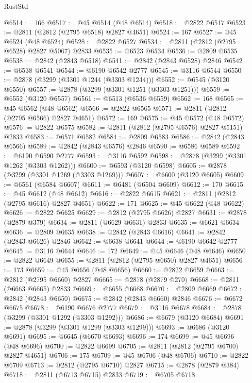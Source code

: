 \begin{lexlean}{RustStd}
\begin{coremodule}
@6514 := 166
@6517 := @45 @6514 (@48 @6514)
@6518 := @2822 @6517
@6523 := @2811 (@2812 (@2795 @6518) @2827 @4651)
@6524 := 167
@6527 := @45 @6524 (@48 @6524)
@6528 := @2822 @6527
@6534 := @2811 (@2812 (@2795 @6528) @2827 @5067) @2833
@6535 := @6523 @6534
@6536 := @2809 @6535
@6538 := @2842 (@2843 @6518)
@6541 := @2842 (@2843 @6528) @2846
@6542 := @6538 @6541
@6544 := @6190 @6542 @2777
@6545 := @3116 @6544
@6550 := @2878 (@3299 (@3301 @1244 (@3303 @1244)))
@6552 := @6545 (@3120 @6550)
@6557 := @2878 (@3299 (@3301 @1251 (@3303 @1251)))
@6559 := @6552 (@3120 @6557)
@6561 := @6513 (@6536 @6559)
@6562 := 168
@6565 := @45 @6562 (@48 @6562)
@6566 := @2822 @6565
@6571 := @2811 (@2812 (@2795 @6566) @2827 @4651)
@6572 := 169
@6575 := @45 @6572 (@48 @6572)
@6576 := @2822 @6575
@6582 := @2811 (@2812 (@2795 @6576) @2827 @5151) @2833
@6583 := @6571 @6582
@6584 := @2809 @6583
@6586 := @2842 (@2843 @6566)
@6589 := @2842 (@2843 @6576) @2846
@6590 := @6586 @6589
@6592 := @6190 @6590 @2777
@6593 := @3116 @6592
@6598 := @2878 (@3299 (@3301 @1262 (@3303 @1262)))
@6600 := @6593 (@3120 @6598)
@6605 := @2878 (@3299 (@3301 @1269 (@3303 @1269)))
@6607 := @6600 (@3120 @6605)
@6609 := @6561 (@6584 @6607)
@6611 := @6481 (@6504 @6609)
@6612 := 170
@6615 := @45 @6612 (@48 @6612)
@6616 := @2822 @6615
@6621 := @2811 (@2812 (@2795 @6616) @2827 @4651)
@6622 := 171
@6625 := @45 @6622 (@48 @6622)
@6626 := @2822 @6625
@6629 := @2812 (@2795 @6626) @2827
@6631 := @2878 (@2879 @379)
@6634 := @2811 (@6629 @6631) @2833
@6635 := @6621 @6634
@6636 := @2809 @6635
@6638 := @2842 (@2843 @6616)
@6641 := @2842 (@2843 @6626) @2846
@6642 := @6638 @6641
@6644 := @6190 @6642 @2777
@6645 := @3116 @6644
@6646 := 172
@6649 := @45 @6646 (@48 @6646)
@6650 := @2822 @6649
@6655 := @2811 (@2812 (@2795 @6650) @2827 @4651)
@6656 := 173
@6659 := @45 @6656 (@48 @6656)
@6660 := @2822 @6659
@6663 := @2812 (@2795 @6660) @2827
@6665 := @2878 (@2879 @270)
@6668 := @2811 (@6663 @6665) @2833
@6669 := @6655 @6668
@6670 := @2809 @6669
@6672 := @2842 (@2843 @6650)
@6675 := @2842 (@2843 @6660) @2846
@6676 := @6672 @6675
@6678 := @6190 @6676 @2777
@6679 := @3116 @6678
@6684 := @2878 (@3299 (@3301 @1292 (@3303 @1292)))
@6686 := @6679 (@3120 @6684)
@6691 := @2878 (@3299 (@3301 @1299 (@3303 @1299)))
@6693 := @6686 (@3120 @6691)
@6695 := @6645 (@6670 @6693)
@6696 := 174
@6699 := @45 @6696 (@48 @6696)
@6700 := @2822 @6699
@6705 := @2811 (@2812 (@2795 @6700) @2827 @4651)
@6706 := 175
@6709 := @45 @6706 (@48 @6706)
@6710 := @2822 @6709
@6713 := @2812 (@2795 @6710) @2827
@6715 := @2878 (@2879 @384)
@6718 := @2811 (@6713 @6715) @2833
@6719 := @6705 @6718

\end{coremodule}
\end{lexlean}
